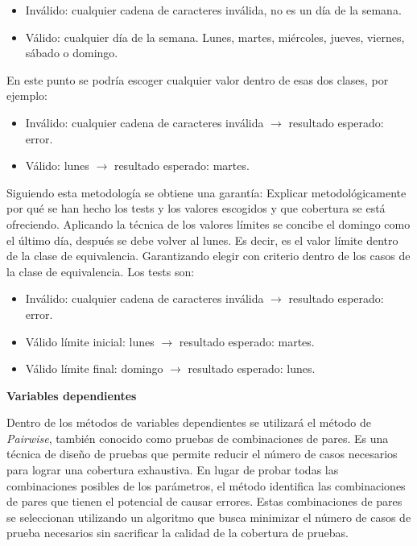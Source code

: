\begin{itemize}
    \item Inválido: cualquier cadena de caracteres inválida, no es un día de la semana.
    \item Válido: cualquier día de la semana.
    Lunes, martes, miércoles, jueves, viernes, sábado o domingo.
\end{itemize}

En este punto se podría escoger cualquier valor dentro de esas dos clases, por ejemplo:

\begin{itemize}
    \item Inválido: cualquier cadena de caracteres inválida \(\longrightarrow\) resultado esperado: error.
    \item Válido: lunes \(\longrightarrow\) resultado esperado: martes.
\end{itemize}

Siguiendo esta metodología se obtiene una garantía: Explicar metodológicamente por qué se han hecho los tests y los valores escogidos y que cobertura se está ofreciendo.
Aplicando la técnica de los valores límites se concibe el domingo como el último día, después se debe volver al lunes.
Es decir, es el valor límite dentro de la clase de equivalencia.
Garantizando elegir con criterio dentro de los casos de la clase de equivalencia.
Los tests son:

\begin{itemize}
    \item Inválido: cualquier cadena de caracteres inválida \(\longrightarrow\) resultado esperado: error.
    \item Válido límite inicial: lunes \(\longrightarrow\) resultado esperado: martes.
    \item Válido límite final: domingo \(\longrightarrow\) resultado esperado: lunes.
\end{itemize}

\textbf{Variables dependientes}\label{variablesDependendientes}

Dentro de los métodos de variables dependientes se utilizará el método de \textit{Pairwise}, también conocido como pruebas de combinaciones de pares.
Es una técnica de diseño de pruebas que permite reducir el número de casos necesarios para lograr una cobertura exhaustiva.
En lugar de probar todas las combinaciones posibles de los parámetros, el método identifica las combinaciones de pares que tienen el potencial de causar errores.
Estas combinaciones de pares se seleccionan utilizando un algoritmo que busca minimizar el número de casos de prueba necesarios sin sacrificar la calidad de la cobertura de pruebas.


